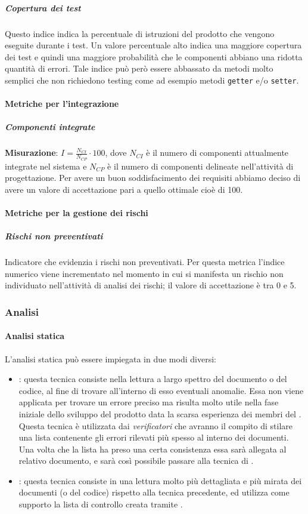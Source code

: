 \subparagraph{Copertura dei test}
Questo indice indica la percentuale di istruzioni del prodotto che vengono eseguite durante i test.
Un valore percentuale alto indica una maggiore copertura dei test e quindi una maggiore probabilità che le componenti abbiano una ridotta quantità di errori.
Tale indice può però essere abbassato da metodi molto semplici che non richiedono testing come ad esempio metodi \texttt{getter} e/o \texttt{setter}.		

\paragraph{Metriche per l'integrazione}
\subparagraph{Componenti integrate}
\textbf{Misurazione}: $I=\frac{N_{CI}}{N_{CP}} \cdot 100$, dove $N_{CI}$ è il numero di componenti attualmente integrate nel sistema e $N_{CP}$ è il numero di componenti delineate nell'attività di progettazione.
Per avere un buon soddisfacimento dei requisiti abbiamo deciso di avere un valore di accettazione pari a quello ottimale cioè di 100.

\paragraph{Metriche per la gestione dei rischi}

\subparagraph{Rischi non preventivati}
Indicatore che evidenzia i rischi non preventivati.
Per questa metrica l'indice numerico viene incrementato nel momento in cui si manifesta un rischio non individuato nell’attività di analisi dei rischi; il valore di accettazione è tra 0 e 5.


\subsubsection{Analisi}
\paragraph{Analisi statica}
L'analisi statica può essere impiegata in due modi diversi:
\begin{itemize}
  \item \textbf{}: questa tecnica  consiste nella
  lettura a largo spettro del documento o del codice, al fine di trovare all'interno di esso eventuali anomalie. Essa non viene applicata per trovare un errore preciso ma risulta
  molto utile nella fase iniziale dello sviluppo del prodotto data la scarsa
  esperienza dei membri del . Questa tecnica è utilizzata dai \textit{verificatori}
  che avranno il compito di stilare una lista contenente gli errori rilevati più
  spesso al interno dei documenti. Una volta che la lista ha preso una certa consistenza essa sarà allegata al relativo documento, e sarà così possibile passare alla tecnica di .
  \item \textbf{}: questa tecnica consiste in una
  lettura molto più dettagliata e più mirata dei documenti (o del codice) rispetto alla tecnica precedente, ed utilizza come supporto la lista di controllo creata tramite .
\end{itemize}

